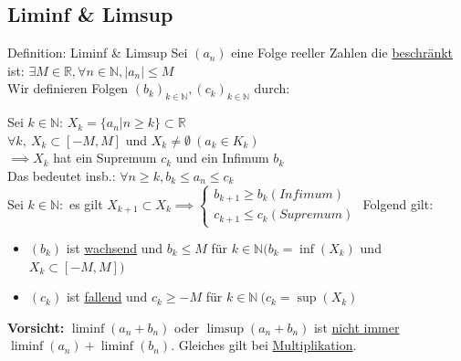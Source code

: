 \documentclass[a4paper,10pt]{article}
\begin{document}
\subsection{Liminf \& Limsup}
\begin{defbox}{Definition: Liminf \& Limsup}
    Sei $(a_n)$ eine Folge reeller Zahlen die \underline{beschränkt} ist: $\exists M \in \mathbb R, \forall n \in \mathbb N, |a_n|\le M$
    \\ Wir definieren Folgen $(b_k)_{k\in \mathbb N}, (c_k)_{k\in \mathbb N}$ durch:
    \begin{center}
        Sei $k \in \mathbb N$:
        $X_k=\{a_n|n\ge k\}\subset \mathbb R$
        \\ $\forall k, \ X_k\subset [-M,M]$ und $X_k\neq \emptyset \ (a_k \in K_k)$ 
        \\ $\implies X_k$ hat ein Supremum $c_k$ und ein Infimum $b_k$
        \\ Das bedeutet insb.: $\forall n \ge k, b_k\le a_n \le c_k$
        \\ Sei $k\in \mathbb N:$ es gilt $X_{k+1}\subset X_k\implies
        \begin{cases}
            b_{k+1}\ge b_k (Infimum)\\
            c_{k+1}\le c_k (Supremum)
        \end{cases}
        $
        Folgend gilt: 
        \begin{itemize}
            \item $(b_k)$ ist \underline{wachsend} und $b_k\le M$ für $k\in \mathbb N (b_k=\inf(X_k)$ und $X_k\subset [-M,M])$
            \item $(c_k)$ ist \underline{fallend} und $c_k\ge -M$ für $k\in \mathbb N \ (c_k=\sup(X_k)$
        \end{itemize}
    \end{center}
\end{defbox}
\begin{flushleft}
    \textbf{Vorsicht:} $\liminf(a_n+b_n)$ oder $\limsup(a_n+b_n)$ ist \underline{nicht immer} $\liminf(a_n)+\liminf(b_n)$. Gleiches gilt bei \underline{Multiplikation}.
\end{flushleft}
\end{document}
